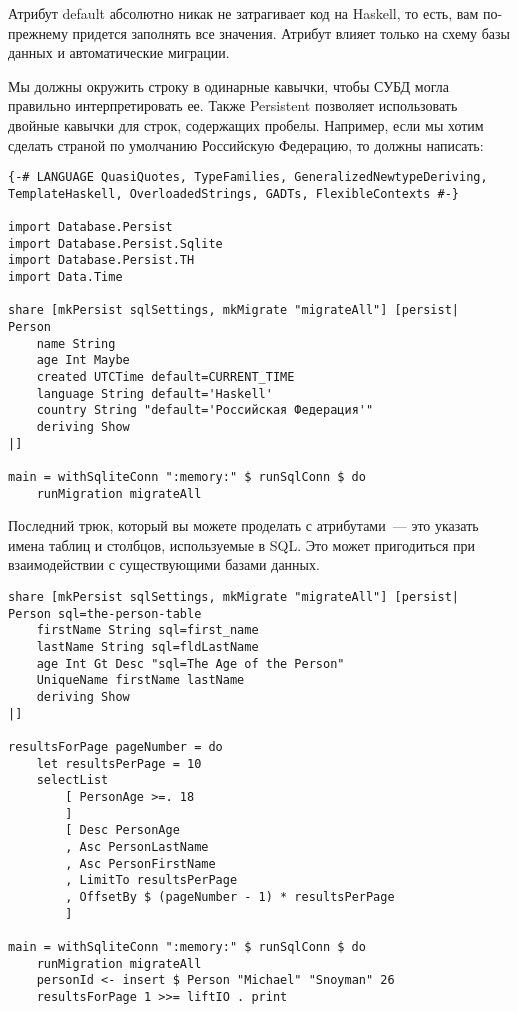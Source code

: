 \begin{remark}
Атрибут default абсолютно никак не затрагивает код на Haskell, то есть, вам по-прежнему придется заполнять все значения. Атрибут влияет только на схему базы данных и автоматические миграции.
\end{remark}

Мы должны окружить строку в одинарные кавычки, чтобы СУБД могла правильно интерпретировать ее. Также Persistent позволяет использовать двойные кавычки для строк, содержащих пробелы. Например, если мы хотим сделать страной по умолчанию Российскую Федерацию, то должны написать:

\begin{lstlisting}
{-# LANGUAGE QuasiQuotes, TypeFamilies, GeneralizedNewtypeDeriving, TemplateHaskell, OverloadedStrings, GADTs, FlexibleContexts #-}

import Database.Persist
import Database.Persist.Sqlite
import Database.Persist.TH
import Data.Time

share [mkPersist sqlSettings, mkMigrate "migrateAll"] [persist|
Person
    name String
    age Int Maybe
    created UTCTime default=CURRENT_TIME
    language String default='Haskell'
    country String "default='Российская Федерация'"
    deriving Show
|]

main = withSqliteConn ":memory:" $ runSqlConn $ do
    runMigration migrateAll
\end{lstlisting}%

Последний трюк, который вы можете проделать с атрибутами~--- это указать имена таблиц и столбцов, используемые в SQL. Это может пригодиться при взаимодействии с существующими базами данных.

\begin{lstlisting}
share [mkPersist sqlSettings, mkMigrate "migrateAll"] [persist|
Person sql=the-person-table
    firstName String sql=first_name
    lastName String sql=fldLastName
    age Int Gt Desc "sql=The Age of the Person"
    UniqueName firstName lastName
    deriving Show
|]

resultsForPage pageNumber = do
    let resultsPerPage = 10
    selectList
        [ PersonAge >=. 18
        ]
        [ Desc PersonAge
        , Asc PersonLastName
        , Asc PersonFirstName
        , LimitTo resultsPerPage
        , OffsetBy $ (pageNumber - 1) * resultsPerPage
        ]

main = withSqliteConn ":memory:" $ runSqlConn $ do
    runMigration migrateAll
    personId <- insert $ Person "Michael" "Snoyman" 26
    resultsForPage 1 >>= liftIO . print
\end{lstlisting}%

